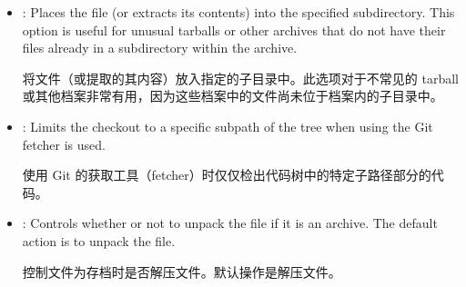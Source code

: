 {\begin{itemize}
\medskip
\begin{codeblock}
\footnotesize
\texttt{\noindent
SRC\_URI = "git://example.com/foo.git;branch=main;name=first  \textbackslash  \linebreak
${}$\ \ \ \ \ \ \ \ \ \ \ git://example.com/bar.git;branch=main;name=second  \textbackslash  \linebreak
${}$\ \ \ \ \ \ \ \ \ \ \ http://example.com/file.tar.gz;name=third" \linebreak
\linebreak
SRCREV\_first = "f1d2d2f924e986ac86fdf7b36c94bcdf32beec15" \linebreak
SRCREV\_second = "e242ed3bffccdf271b7fbaf34ed72d089537b42f" \linebreak
SRC\_URI[third.sha256sum] = "13550350a8681c84c861aac2e5b440161c2b33a3e4f302ac680ca5b686de48de" \linebreak
}
\end{codeblock}

\medskip
\item {}: Places the file (or extracts its contents) into the specified subdirectory. This option is useful for unusual tarballs or other archives that do not have their files already in a subdirectory within the archive. \par
将文件（或提取的其内容）放入指定的子目录中。此选项对于不常见的 tarball 或其他档案非常有用，因为这些档案中的文件尚未位于档案内的子目录中。

\item {}: Limits the checkout to a specific subpath of the tree when using the Git fetcher is used.\par
使用 Git 的获取工具（fetcher）时仅仅检出代码树中的特定子路径部分的代码。

\item {}: Controls whether or not to unpack the file if it is an archive. The default action is to unpack the file. \par
控制文件为存档时是否解压文件。默认操作是解压文件。
\end{itemize}

}


